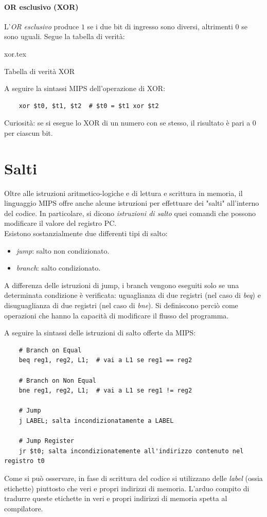 \documentclass[class=book, crop=false]{standalone}
\begin{document}
\paragraph{OR esclusivo (XOR)}
L'\emph{OR esclusivo} produce \(1\) se i due bit di ingresso sono diversi, altrimenti \(0\) se sono uguali. Segue la tabella di verità:
\begin{table}[H]
	\centering
	{xor.tex}
	\caption{Tabella di verità XOR}
\end{table}

A seguire la sintassi MIPS dell'operazione di XOR:
\begin{verbatim}
	xor $t0, $t1, $t2  # $t0 = $t1 xor $t2
\end{verbatim}

Curiosità: se si esegue lo XOR di un numero con se stesso, il risultato è pari a \(0\) per ciascun bit.

\section{Salti}
Oltre alle istruzioni aritmetico-logiche e di lettura e scrittura in memoria, il linguaggio MIPS offre anche alcune istruzioni per effettuare dei "salti" all'interno del codice. In particolare, si dicono \emph{istruzioni di salto} quei comandi che possono modificare il valore del registro PC.\\
Esistono sostanzialmente due differenti tipi di salto:
\begin{itemize}
	\item \emph{jump}: salto non condizionato.
	\item \emph{branch}: salto condizionato.
\end{itemize}
A differenza delle istruzioni di jump, i branch vengono eseguiti solo se una determinata condizione è verificata: uguaglianza di due registri (nel caso di \emph{beq}) e disuguaglianza di due registri (nel caso di \emph{bne}). Si definiscono perciò come operazioni che hanno la capacità di modificare il flusso del programma.

A seguire la sintassi delle istruzioni di salto offerte da MIPS:
\begin{verbatim}
	# Branch on Equal
	beq reg1, reg2, L1;  # vai a L1 se reg1 == reg2

	# Branch on Non Equal
	bne reg1, reg2, L1;  # vai a L1 se reg1 != reg2

	# Jump
	j LABEL; salta incondizionatamente a LABEL

	# Jump Register
	jr $t0; salta incondizionatemente all'indirizzo contenuto nel registro t0
\end{verbatim}
Come si può osservare, in fase di scrittura del codice si utilizzano delle \emph{label} (ossia etichette) piuttosto che veri e propri indirizzi di memoria. L'arduo compito di tradurre queste etichette in veri e propri indirizzi di memoria spetta al compilatore.
\end{document}
